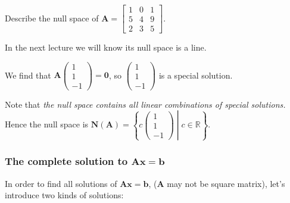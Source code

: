 \begin{example}
Describe the null space of $\bm A = \begin{bmatrix}
1&0&1\\5&4&9\\2&3&5
\end{bmatrix}.$

In the next lecture we will know its null space is a line.

We find that $\bm A\begin{pmatrix}
1\\1\\-1
\end{pmatrix}= \bm 0$, so $\begin{pmatrix}
1\\1\\-1
\end{pmatrix}$ is a special solution. 

Note that \textit{the null space contains all linear combinations of special solutions.} Hence the null space is $\bm N(\bm A) = \left\{c\begin{pmatrix}
1\\1\\-1
\end{pmatrix}\middle| c\in\mathbb{R}\right\}$.
\end{example}
\subsubsection{The complete solution to $\bm{Ax} = \bm b$}
In order to find all solutions of $\bm{Ax} = \bm b$, ($\bm A$ may not be square matrix), let's introduce two kinds of solutions:

